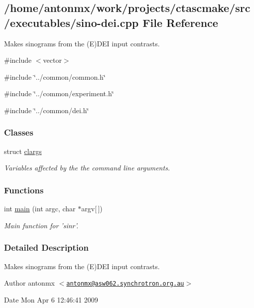 \hypertarget{sino-dei_8cpp}{
\subsection{/home/antonmx/work/projects/ctascmake/src/executables/sino-\/dei.cpp File Reference}
\label{sino-dei_8cpp}
}


Makes sinograms from the (E)DEI input contrasts.  


{\ttfamily \#include $<$vector$>$}\par
{\ttfamily \#include \char`\"{}../common/common.h\char`\"{}}\par
{\ttfamily \#include \char`\"{}../common/experiment.h\char`\"{}}\par
{\ttfamily \#include \char`\"{}../common/dei.h\char`\"{}}\par
\subsubsection*{Classes}
\begin{DoxyCompactItemize}
\item 
struct \hyperlink{structclargs}{clargs}
\begin{DoxyCompactList}\small\item\em Variables affected by the the command line arguments. \item\end{DoxyCompactList}\end{DoxyCompactItemize}
\subsubsection*{Functions}
\begin{DoxyCompactItemize}
\item 
int \hyperlink{sino-dei_8cpp_a0ddf1224851353fc92bfbff6f499fa97}{main} (int argc, char $\ast$argv\mbox{[}$\,$\mbox{]})
\begin{DoxyCompactList}\small\item\em Main function for 'sinr'. \item\end{DoxyCompactList}\end{DoxyCompactItemize}


\subsubsection{Detailed Description}
Makes sinograms from the (E)DEI input contrasts. \begin{DoxyAuthor}{Author}
antonmx $<$\href{mailto:antonmx@asw062.synchrotron.org.au}{\tt antonmx@asw062.synchrotron.org.au}$>$ 
\end{DoxyAuthor}
\begin{DoxyDate}{Date}
Mon Apr 6 12:46:41 2009 
\end{DoxyDate}


